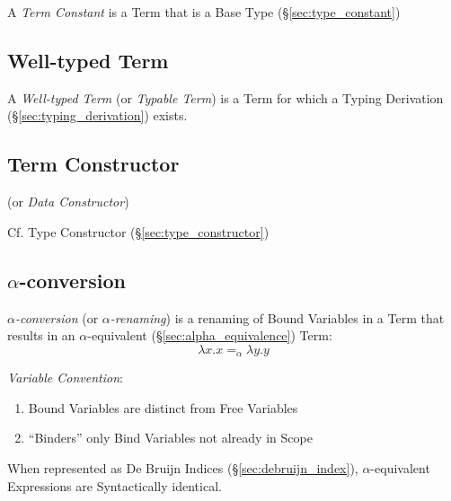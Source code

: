 A \emph{Term Constant} is a Term that is a Base Type
(\S\ref{sec:type_constant})



\subsection{Well-typed Term}\label{sec:well_typed}

A \emph{Well-typed Term} (or \emph{Typable Term}) is a Term for which
a Typing Derivation (\S\ref{sec:typing_derivation}) exists.



\subsection{Term Constructor}\label{sec:term_constructor}

(or \emph{Data Constructor})

\fist Cf. Type Constructor (\S\ref{sec:type_constructor})



\subsection{$\alpha$-conversion}\label{sec:alpha_conversion}

\emph{$\alpha$-conversion} (or \emph{$\alpha$-renaming}) is a renaming
of Bound Variables in a Term that results in an $\alpha$-equivalent
(\S\ref{sec:alpha_equivalence}) Term:
\[
  \lambda x.x =_\alpha \lambda y.y
\]

\emph{Variable Convention}:
\begin{enumerate}
  \item Bound Variables are distinct from Free Variables
  \item ``Binders'' only Bind Variables not already in Scope %
\end{enumerate}

When represented as De Bruijn Indices (\S\ref{sec:debruijn_index}),
$\alpha$-equivalent Expressions are Syntactically identical.

